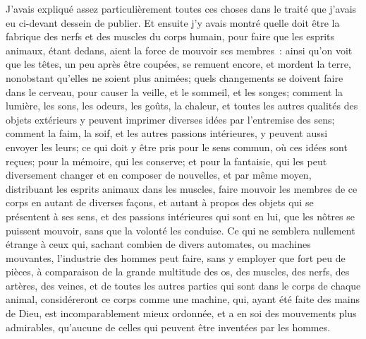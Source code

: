 \documentclass[french,twoside]{book} %
\begin{document}
J'avais expliqué assez particulièrement toutes ces choses dans le traité que j'avais eu ci-devant dessein de publier. Et ensuite j'y avais montré quelle doit être la fabrique des nerfs et des muscles du corps humain, pour faire que les esprits animaux, étant dedans, aient la force de mouvoir ses membres : ainsi qu'on voit que les têtes, un peu après être coupées, se remuent encore, et mordent la terre, nonobstant qu'elles ne soient plus animées; quels changements se doivent faire dans le cerveau, pour causer la veille, et le sommeil, et les songes; comment la lumière, les sons, les odeurs, les goûts, la chaleur, et toutes les autres qualités des objets extérieurs y peuvent imprimer diverses idées par l'entremise des sens; comment la faim, la soif, et les autres passions intérieures, y peuvent aussi envoyer les leurs; ce qui doit y être pris pour le sens commun, où ces idées sont reçues; pour la mémoire, qui les conserve; et pour la fantaisie, qui les peut diversement changer et en composer de nouvelles, et par même moyen, distribuant les esprits animaux dans les muscles, faire mouvoir les membres de ce corps en autant de diverses façons, et autant à propos des objets qui se présentent à ses sens, et des passions intérieures qui sont en lui, que les nôtres se puissent mouvoir, sans que la volonté les conduise. Ce qui ne semblera nullement étrange à ceux qui, sachant combien de divers automates, ou machines mouvantes, l'industrie des hommes peut faire, sans y employer que fort peu de pièces, à comparaison de la grande multitude des os, des muscles, des nerfs, des artères, des veines, et de toutes les autres parties qui sont dans le corps de chaque animal, considéreront ce corps comme une machine, qui, ayant été faite des mains de Dieu, est incomparablement mieux ordonnée, et a en soi des mouvements plus admirables, qu'aucune de celles qui peuvent être inventées par les hommes.\par
\end{document}
